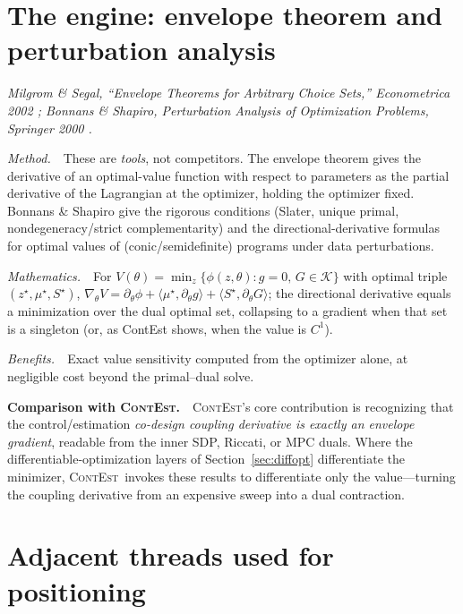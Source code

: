 \documentclass[11pt]{article}
\newcommand{\Th}{\theta}
\newcommand{\ContEst}{\textsc{ContEst}}
\newcommand{\Method}{\smallskip\noindent\textit{Method.}~}
\newcommand{\Maths}{\smallskip\noindent\textit{Mathematics.}~}
\newcommand{\Benefits}{\smallskip\noindent\textit{Benefits.}~}
\newcommand{\Versus}{\smallskip\noindent\textbf{Comparison with \ContEst.}~}
\begin{document}
\section{The engine: envelope theorem and perturbation analysis}\label{sec:envelope}
\noindent\emph{Milgrom \& Segal, ``Envelope Theorems for Arbitrary Choice Sets,''
Econometrica 2002 \cite{milgrom2002envelope}; Bonnans \& Shapiro, \emph{Perturbation
Analysis of Optimization Problems}, Springer 2000 \cite{bonnans2000perturbation}.}

\Method\ These are \emph{tools}, not competitors. The envelope theorem gives the
derivative of an optimal-value function with respect to parameters as the partial
derivative of the Lagrangian at the optimizer, holding the optimizer fixed.
Bonnans \& Shapiro give the rigorous conditions (Slater, unique primal,
nondegeneracy/strict complementarity) and the directional-derivative formulas for
optimal values of (conic/semidefinite) programs under data perturbations.

\Maths\ For $V(\Th)=\min_z\{\phi(z,\Th):g=0,\,G\in\mathcal K\}$ with optimal triple
$(z^\star,\mu^\star,S^\star)$,
$\nabla_\Th V=\partial_\Th\phi+\langle\mu^\star,\partial_\Th g\rangle
+\langle S^\star,\partial_\Th G\rangle$; the directional derivative equals a
minimization over the dual optimal set, collapsing to a gradient when that set is a
singleton (or, as ContEst shows, when the value is $C^1$).

\Benefits\ Exact value sensitivity computed from the optimizer alone, at negligible
cost beyond the primal--dual solve.

\Versus\ \ContEst's core contribution is recognizing that the control/estimation
\emph{co-design coupling derivative is exactly an envelope gradient}, readable from
the inner SDP, Riccati, or MPC duals. Where the differentiable-optimization layers of
Section~\ref{sec:diffopt} differentiate the minimizer, \ContEst\ invokes these
results to differentiate only the value---turning the coupling derivative from an
expensive sweep into a dual contraction.

\section{Adjacent threads used for positioning}\label{sec:adjacent}
\end{document}
